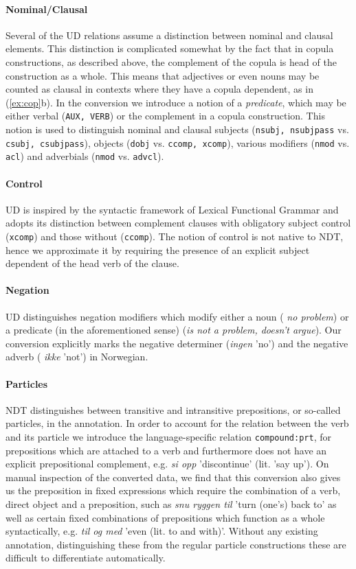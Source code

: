 \documentclass[10pt, a4paper]{article}
\begin{document}
\paragraph{Nominal/Clausal}Several of the UD relations assume a distinction between nominal and
clausal elements. This distinction is complicated somewhat by the fact
that in copula constructions, as described above, the complement of
the copula is head of the construction as a whole. This means that
adjectives or even nouns may be counted as clausal in contexts where
they have a copula dependent, as in (\ref{ex:cop}b).  In the
conversion we introduce a notion of a \emph{predicate}, which may be
either verbal ({\tt AUX, VERB}) or the complement in a copula
construction. This notion is used to distinguish nominal and clausal
subjects ({\tt nsubj, nsubjpass} vs. {\tt csubj, csubjpass}), objects
({\tt dobj} vs. {\tt ccomp, xcomp}), various modifiers ({\tt nmod}
vs. {\tt acl}) and adverbials ({\tt nmod} vs. {\tt advcl}).

\paragraph{Control}UD is inspired by the syntactic framework of Lexical Functional
Grammar \cite{Kap:Bre:82} and adopts its distinction between complement
clauses with obligatory subject control ({\tt xcomp}) and those without
({\tt ccomp}). The notion of control is not native to NDT, hence we
approximate it by requiring the presence of an explicit subject dependent of the
head verb of the clause.


\paragraph{Negation}UD distinguishes negation modifiers which modify either a noun ({\it
  no problem}) or a predicate (in the aforementioned sense) ({\it is
  not a problem, doesn't argue}). Our conversion explicitly marks the
negative determiner ({\it ingen} 'no') and the negative adverb ({\it
  ikke} 'not') in Norwegian.

\paragraph{Particles}NDT distinguishes between transitive and intransitive prepositions, or
so-called particles, in the annotation. In order to account for the
relation between the verb and its particle we introduce the
language-specific relation {\tt compound:prt}, for prepositions which
are attached to a verb and furthermore does not have an explicit prepositional complement,
e.g. {\it si opp} 'discontinue' (lit. 'say up').
On manual inspection of the
converted data, we find that this conversion also gives us the
preposition in fixed expressions which require the combination of a
verb, direct object and a preposition, such as {\it snu ryggen til}
'turn (one's) back to' as well as certain fixed combinations of
prepositions which function as a whole syntactically, e.g. {\it til og
  med} 'even (lit. to and with)'. Without any existing annotation,
distinguishing these from the regular particle constructions these are
difficult to differentiate automatically.
\end{document}
